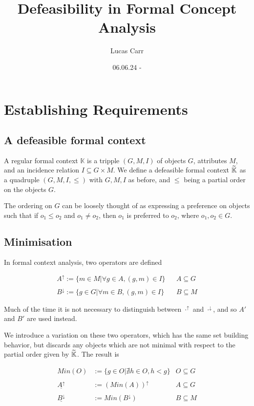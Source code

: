 \documentclass[11pt]{article}
\title{Defeasibility in Formal Concept Analysis}
\author{Lucas Carr}
\date{06.06.24 - }
\begin{document}
\maketitle
\tableofcontents
\clearpage

\section{Establishing Requirements}
\subsection{A defeasible formal context}
A regular formal context $\mathbb{K}$ is a tripple $(G,M,I)$ of objects $G$, attributes $M$, and an incidence relation $I \subseteq G \times M$. We define a defeasible formal context $\widetilde{\mathbb{K}}$ as a quadruple $(G,M,I,\leq)$ with $G,M,I$ as before, and $\leq$ being a partial order on the objects $G$.

The ordering on $G$ can be loosely thought of as expressing a preference on objects such that if $o_1 \leq o_2$ and $o_1 \not = o_2$, then $o_1$ is preferred to $o_2$, where $o_1, o_2 \in G$.

\subsection{Minimisation}
In formal context analysis, two operators are defined

\begin{align*}
  A^{\uparrow} := \{m \in M | \forall g \in A, (g,m) \in I\}   &  & A \subseteq G \\
  \\
  B^{\downarrow} := \{g \in G | \forall m \in B, (g,m) \in I\} &  & B \subseteq M
\end{align*}

Much of the time it is not necessary to distinguish between $\cdot^{\uparrow}$ and $\cdot^{\downarrow}$, and so $A'$ and $B'$ are used instead.

We introduce a variation on these two operators, which has the same set building behavior, but discards any objects which are not minimal with respect to the partial order given by $\widetilde{\mathbb{K}}$. The result is

\begin{align*}
  Min(O)                     & := \{g \in O | \nexists h \in O, h < g \} & O \subseteq G \\
  \\
  \underline{A^{\uparrow}}   & := (Min(A))^{\uparrow}                    & A \subseteq G \\
  \\
  \underline{B^{\downarrow}} & := Min(B^{\downarrow})                    & B \subseteq M
\end{align*}
\end{document}
